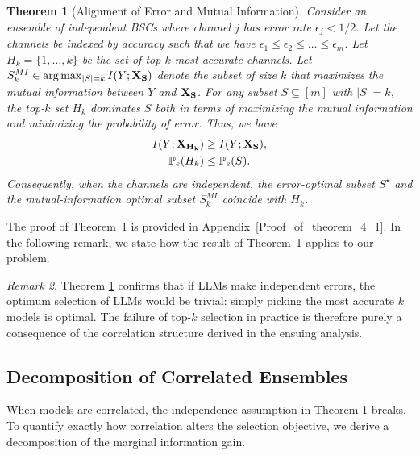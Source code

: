 \documentclass{article}
\theoremstyle{plain}
\newtheorem{theorem}{Theorem}[section]
\theoremstyle{definition}
\theoremstyle{remark}
\newtheorem{remark}[theorem]{Remark}
\begin{document}
\begin{theorem}[Alignment of Error and Mutual Information]
\label{thm:alignment}
Consider an ensemble of independent BSCs where channel $j$ has error rate $\epsilon_j < 1/2$. Let the channels be indexed by accuracy such that we have $\epsilon_1 \le \epsilon_2 \le \ldots \le \epsilon_m$. Let $H_k = \{1, \dots, k\}$ be the set of top-$k$ most accurate channels. Let $S^{MI}_k \in \arg\max_{|S|=k} I(Y;{\bf X_S})$ denote the subset of size $k$ that maximizes the mutual information between $Y$ and ${\bf X_S}$. For any subset $S \subseteq [m]$ with $|S|=k$, the top-$k$ set $H_k$ dominates $S$ both in terms of maximizing the mutual information and minimizing the probability of error. Thus, we have
\begin{align}
    I(Y; {\bf X_{H_k}}) &\ge I(Y; {\bf X_S}), \label{eq:alignment_mi}\\
    \mathbb{P}_e(H_k) &\le \mathbb{P}_e(S). \label{eq:alignment_pe}
\end{align}
Consequently, when the channels are independent, the error-optimal subset $S^\star$ and the mutual-information optimal subset $S^{MI}_k$ coincide with $H_k$.
\end{theorem}
The proof of Theorem~\ref{thm:alignment} is provided in Appendix~\ref{Proof_of_theorem_4_1}. In the following remark, we state how the result of Theorem~\ref{thm:alignment} applies to our problem.

\begin{remark}    
 Theorem \ref{thm:alignment} confirms that if LLMs make independent errors, the optimum selection of LLMs would be trivial: simply picking the most accurate $k$ models is optimal. The failure of top-$k$ selection in practice is therefore purely a consequence of the correlation structure derived in the ensuing analysis.
\end{remark}

\subsection{Decomposition of Correlated Ensembles}
\label{subsec:decomposition}
When models are correlated, the independence assumption in Theorem \ref{thm:alignment} breaks. To quantify exactly how correlation alters the selection objective, we derive a decomposition of the marginal information gain.
\end{document}
